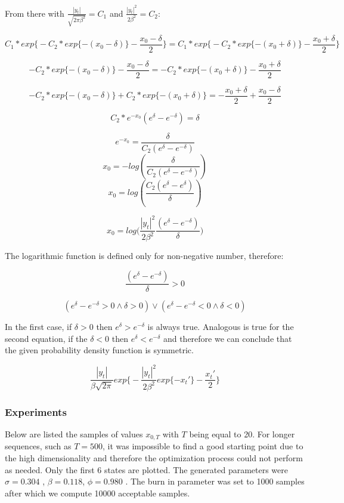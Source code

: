 \documentclass[]{article}
\begin{document}
	From there with $\frac{|y_t|}{\sqrt{2 \pi \beta^2}} = C_1$ and $ \frac{|y_t|^2}{2 \beta^2} = C_2 $:
	
	$$ C_1 * exp \bigg\{ -C_2 * exp\{-(x_0 - \delta) \} - \frac{x_0 - \delta}{2} \bigg\}  = C_1 * exp \bigg\{ -C_2 * exp\{-(x_0 + \delta) \} - \frac{x_0 + \delta}{2} \bigg\}$$
	
	$$ -C_2 * exp\{-(x_0 - \delta) \} - \frac{x_0 - \delta}{2} = -C_2 * exp\{-(x_0 + \delta) \} - \frac{x_0 + \delta}{2} $$
	
	
	$$ -C_2 * exp\{-(x_0 - \delta) \} + C_2 * exp\{-(x_0 + \delta) \} =  - \frac{x_0 + \delta}{2} + \frac{x_0 - \delta}{2}  $$
	
	$$ C_2 *  e^{-x_0} ( e^{ \delta} - e^{ -\delta } ) = \delta $$
	
	
	$$ e^{-x_0}  =  \frac{\delta}{C_2( e^{ \delta} - e^{ -\delta } )} $$
	$$ x_0 =  - log(\frac{\delta}{C_2( e^{ \delta} - e^{ -\delta } )} ) $$
	$$ x_0 =  log(\frac{C_2( e^{\delta } - e^{ \delta}   )}{ \delta} ) $$
	
	$$ x_0 =  log\Big( \frac{|y_t|^2}{2 \beta^2} \frac{( e^{ \delta} - e^{ -\delta }   )}{ \delta} \Big) $$
	
	The logarithmic function is defined only for non-negative number, therefore:
	
	$$ \frac{( e^{ \delta} - e^{ -\delta }   )}{ \delta} > 0 $$ 
	
	$$ ( e^{ \delta} - e^{ -\delta } > 0 \land \delta >0 ) \lor ( e^{ \delta} - e^{ -\delta } < 0 \land \delta <0 )$$
	
	
	In the first case, if $\delta >0$ then $ e^\delta > e^{-\delta} $ is always true. Analogous is true for the second equation, if the $\delta <0$ then $ e^\delta < e^{-\delta} $ and therefore we can conclude that the given probability density function is symmetric.
	
	$$\frac{|y_t|}{\beta \sqrt{2 \pi}} exp \bigg\{ -\frac{|y_t|^2}{2 \beta^2} exp\{-x_t' \} - \frac{x_t'}{2} \bigg\}$$
	
	\subsubsection*{Experiments}
	
	Below are listed the samples of values $x_{0,T}$ with $T$ being equal to 20. For longer sequences, such as $T=500$, it was impossible to find a good starting point due to the high dimensionality and therefore the optimization process could not perform as needed. Only the first 6 states are plotted. The generated parameters were $\sigma = 0.304 $ , $\beta = 0.118 $, $\phi = 0.980 $ . The burn in parameter was set to 1000 samples after which we compute 10000 acceptable samples.
	
\end{document}
